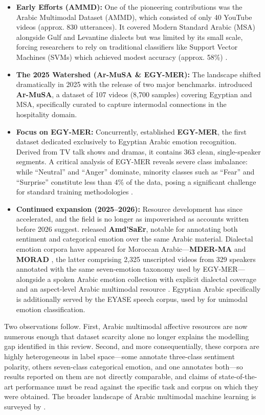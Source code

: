 \documentclass[12pt, a4paper]{article}
\begin{document}
\begin{itemize}
    \item \textbf{Early Efforts (AMMD):} One of the pioneering contributions was the Arabic Multimodal Dataset (AMMD), which consisted of only 40 YouTube videos (approx. 830 utterances). It covered Modern Standard Arabic (MSA) alongside Gulf and Levantine dialects but was limited by its small scale, forcing researchers to rely on traditional classifiers like Support Vector Machines (SVMs) which achieved modest accuracy (approx. 58\%) \citep{Alqarafi2019}.
    \item \textbf{The 2025 Watershed (Ar-MuSA \& EGY-MER):} The landscape shifted dramatically in 2025 with the release of two major benchmarks. \citet{Khaled2025} introduced \textbf{Ar-MuSA}, a dataset of 107 videos (8,700 samples) covering Egyptian and MSA, specifically curated to capture intermodal connections in the hospitality domain.
    \item \textbf{Focus on EGY-MER:} Concurrently, \citet{Hussein2025} established \textbf{EGY-MER}, the first dataset dedicated exclusively to Egyptian Arabic emotion recognition. Derived from TV talk shows and dramas, it contains 363 clean, single-speaker segments. A critical analysis of EGY-MER reveals severe class imbalance: while ``Neutral'' and ``Anger'' dominate, minority classes such as ``Fear'' and ``Surprise'' constitute less than 4\% of the data, posing a significant challenge for standard training methodologies \citep{Hussein2025}.
    \item \textbf{Continued expansion (2025--2026):} Resource development has since accelerated, and the field is no longer as impoverished as accounts written before 2026 suggest. \citet{Haouhat2025a} released \textbf{Amd'SaEr}, notable for annotating both sentiment and categorical emotion over the same Arabic material. Dialectal emotion corpora have appeared for Moroccan Arabic---\textbf{MDER-MA} \citep{Ouali2025} and \textbf{MORAD} \citep{Atou2026}, the latter comprising 2{,}325 unscripted videos from 329 speakers annotated with the same seven-emotion taxonomy used by EGY-MER---alongside a spoken Arabic emotion collection with explicit dialectal coverage \citep{Aslan2025} and an aspect-level Arabic multimodal resource \citep{Alkatheri2026}. Egyptian Arabic specifically is additionally served by the EYASE speech corpus, used by \citet{Abd2026} for unimodal emotion classification.
\end{itemize}

Two observations follow. First, Arabic multimodal affective resources are now numerous enough that dataset scarcity alone no longer explains the modelling gap identified in this review. Second, and more consequentially, these corpora are highly heterogeneous in label space---some annotate three-class sentiment polarity, others seven-class categorical emotion, and one annotates both---so results reported on them are not directly comparable, and claims of state-of-the-art performance must be read against the specific task and corpus on which they were obtained. The broader landscape of Arabic multimodal machine learning is surveyed by \citet{Haouhat2025}.
\end{document}
